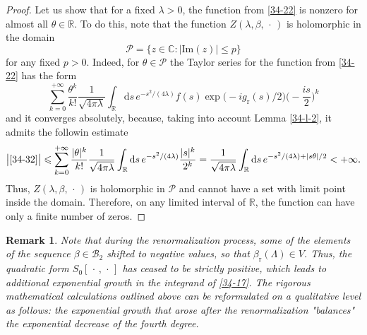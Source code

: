 \documentclass[a4paper]{article}
\newtheorem{remark}{Remark}
\begin{document}
\begin{proof}
Let us show that for a fixed $\lambda>0$, the function from \eqref{34-22} is nonzero for almost all $\theta\in\mathbb{R}$. To do this, note that the function $Z(\lambda,\beta,\,\cdot\,)$ is holomorphic in the domain
$$\mathcal{P}=\{z\in\mathbb{C}:|\mathrm{Im}(z)|\leqslant p\}$$
for any fixed $p>0$. Indeed, for $\theta\in\mathcal{P}$ the Taylor series for the function from \eqref{34-22} has the form
\begin{equation}\label{34-33}
	\sum_{k=0}^{+\infty}\frac{\theta^k}{k!}\frac{1}{\sqrt{4\pi\lambda}}
	\int_{\mathbb{R}}\mathrm{d}s\,e^{-s^2/(4\lambda)}f(s)\exp\big(-ig_{\mathrm{r}}(s)/2\big)\bigg(-\frac{is}{2}\bigg)^k
\end{equation}
and it converges absolutely, because, taking into account Lemma \ref{34-l-2}, it admits the followin estimate
\begin{equation*}
\big|\eqref{34-32}\big|\leqslant
\sum_{k=0}^{+\infty}\frac{|\theta|^k}{k!}\frac{1}{\sqrt{4\pi\lambda}}
\int_{\mathbb{R}}\mathrm{d}s\,e^{-s^2/(4\lambda)}\frac{|s|^k}{2^k}=
\frac{1}{\sqrt{4\pi\lambda}}
\int_{\mathbb{R}}\mathrm{d}s\,e^{-s^2/(4\lambda)+|s\theta|/2}<+\infty.
\end{equation*}
Thus, $Z(\lambda,\beta,\,\cdot\,)$ is holomorphic in $\mathcal{P}$ and cannot have a set with limit point inside the domain. Therefore, on any limited interval of $\mathbb{R}$, the function can have only a finite number of zeros.
\end{proof}
\begin{remark}\label{34-r-6}
Note that during the renormalization process, some of the elements of the sequence $\beta\in\mathcal{B}_2$ shifted to negative values, so that $\beta_{\mathrm{r}}(\Lambda)\in V$. Thus, the quadratic form $S_0[\,\cdot\,,\,\cdot\,]$ has ceased to be strictly positive, which leads to additional exponential growth in the integrand of \eqref{34-17}. The rigorous mathematical calculations outlined above can be reformulated on a qualitative level as follows: the exponential growth that arose after the renormalization "balances" the exponential decrease of the fourth degree.
\end{remark}
\end{document}
